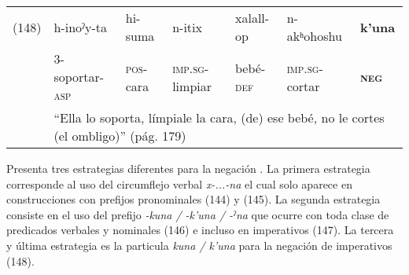 {{\small
\noindent \begin{tabular}{lllllll}
(148) & h-inoˀy-ta & hi-suma & n-itix & xalall-op & n-akʰohoshu & \textbf{k’una} \\
& \textsc{3-}soportar-\textsc{asp} & \textsc{pos}-cara & \textsc{imp.sg-}limpiar & bebé-\textsc{def} & \textsc{imp.sg-}cortar & \textsc{\textbf{neg}} \\
& \multicolumn{6}{l}{``Ella lo soporta, límpiale la cara, (de) ese bebé, no le cortes (el ombligo)'' (pág. 179)}
\end{tabular} \vspace{0.5cm}}

}

Presenta tres estrategias diferentes para la negación \textcolor{MidnightBlue}{\citep{chimariko}}. La primera estrategia corresponde al uso del circumflejo verbal {\setmainfont{Charis SIL} \textit{x-...-na}} el cual solo aparece en construcciones con prefijos pronominales (144) y (145). La segunda estrategia consiste en el uso del prefijo {\setmainfont{Charis SIL} \textit{-kuna / -k'una / -ˀna}} que ocurre con toda clase de predicados verbales y nominales (146) e incluso en imperativos (147). La tercera y última estrategia es la particula {\setmainfont{Charis SIL} \textit{kuna / k'una}} para la negación de imperativos (148).